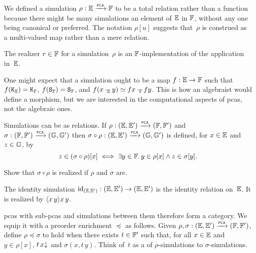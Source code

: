 We defined a simulation $\rho : \EE \pcato \FF$ to be a total relation rather than a function because there might be many simulations an element of $\EE$ in $\FF$, without any one being canonical or preferred. The notation $\rho[u]$ suggests that~$\rho$ is construed as a multi-valued map rather than a mere relation.

The realizer $r \in \FF$ for a simulation~$\rho$ is an $\FF$-implementation of the application in~$\EE$.

One might expect that a simulation ought to be a map $f : \EE \to \FF$ such that $f(\combK_\EE) = \combK_\FF$, $f(\combS_\FF) = \combS_\FF$, and $f (x \cdot_\EE y) \kleq f x \cdot_\FF f y$. This is how an algebraist would define a morphism, but we are interested in the computational aspects of pcas, not the algebraic ones.

%
%
%
Simulations can be  as relations.
If $\rho: (\EE, \subEE) \pcato (\FF, \subFF)$ and $\sigma: (\FF,
\subFF) \pcato (\GG, \subGG)$ then $\sigma \circ \rho: (\EE, \subEE)
\pcato (\GG, \subGG)$ is defined, for $x \in \EE$ and $z \in \GG$, by
%
\begin{equation*}
  z \in (\sigma \circ \rho)[x]
  \iff
  \some{y \in \FF} y \in \rho[x] \land z \in \sigma[y].
\end{equation*}

\begin{exercise}
  Show that $\sigma \circ \rho$ is realized if $\rho$ and $\sigma$ are.
\end{exercise}

The identity simulation $\id[(\EE, \subEE)]: (\EE,
\subEE) \to (\EE, \subEE)$ is the identity relation on~$\EE$. It is realized by $\pcalam{x\,y} x \, y$.

pcas with sub-pcas and simulations between them therefore form a category. We equip it with a preorder enrichment $\preceq$ as follows.
%
%
%
%
%
Given $\rho, \sigma : (\EE, \subEE) \pcato (\FF, \subFF)$, define $\rho \preceq \sigma$ to hold when
there exists $t \in \subFF$ such that, for all $x \in \EE$ and $y \in \rho[x]$, $\defined{t \, x}$ and $\sigma(x, t \, y)$.
Think of~$t$ as a  of $\rho$-simulations to
$\sigma$-simulations.

